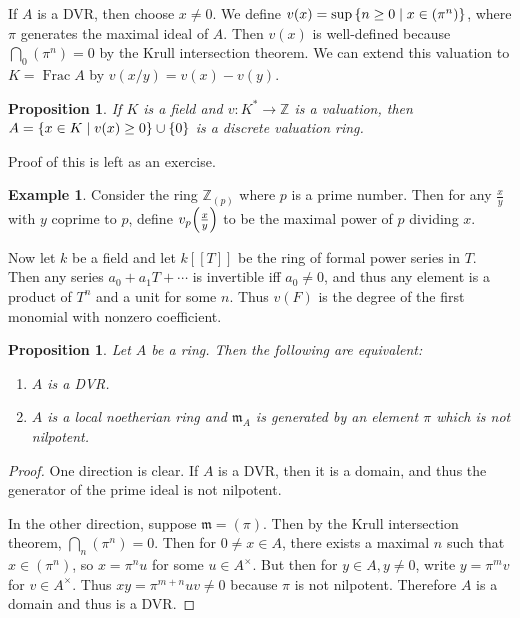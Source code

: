 \documentclass[leqno, openany]{memoir}
\newtheorem{prop}[thm]{Proposition}
\theoremstyle{definition}
\newtheorem{exm}[thm]{Example}
\theoremstyle{remark}
\theoremstyle{plain}
\theoremstyle{definition}
\theoremstyle{remark}
\newcommand{\Z}{\mathbb{Z}}
\newcommand{\mf}[1]{\mathfrak{#1}}
\begin{document}
If $A$ is a DVR, then choose $x \neq 0$. We define $v(x) = \sup \qty{n \geq 0
\mid x \in (\pi^n)}$, where $\pi$ generates the maximal ideal of $A$. Then
$v(x)$ is well-defined because $\bigcap_0 (\pi^n) = 0$ by the Krull
intersection theorem. We can extend this valuation to $K = \operatorname{Frac}
A$ by $v(x/y) = v(x) - v(y)$. 

\begin{prop} If $K$ is a field and $v \colon K^* \to \Z$ is a valuation, then
$A = \qty{x \in K \mid v(x) \geq 0} \cup \qty{0}$ is a discrete valuation ring.
\end{prop}

Proof of this is left as an exercise.

\begin{exm} Consider the ring $\Z_{(p)}$ where $p$ is a prime number. Then for
    any $\frac{x}{y}$ with $y$ coprime to $p$, define $v_p\qty(\frac{x}{y})$ to
    be the maximal power of $p$ dividing $x$.

    Now let $k$ be a field and let $k[[T]]$ be the ring of formal power series
in $T$. Then any series $a_0 + a_1 T + \cdots$ is invertible iff $a_0 \neq 0$,
and thus any element is a product of $T^n$ and a unit for some $n$. Thus $v(F)$
is the degree of the first monomial with nonzero coefficient.  \end{exm}

\begin{prop} Let $A$ be a ring. Then the following are equivalent:
\begin{enumerate} \item $A$ is a DVR.  \item $A$ is a local noetherian ring and
$\mf{m}_A$ is generated by an element $\pi$ which is not nilpotent.
\end{enumerate} \end{prop}

\begin{proof} One direction is clear. If $A$ is a DVR, then it is a domain, and
    thus the generator of the prime ideal is not nilpotent.

    In the other direction, suppose $\mf{m} = (\pi)$. Then by the Krull
intersection theorem, $\bigcap_n (\pi^n) = 0$. Then for $0 \neq x \in A$, there
exists a maximal $n$ such that $x \in (\pi^n)$, so $x = \pi^n u$ for some $u
\in A^{\times}$. But then for $y \in A, y \neq 0$, write $y = \pi^m v$ for $v
\in A^{\times}$. Thus $xy = \pi^{m+n} uv \neq 0$ because $\pi$ is not
nilpotent. Therefore $A$ is a domain and thus is a DVR.  \end{proof}
\end{document}
